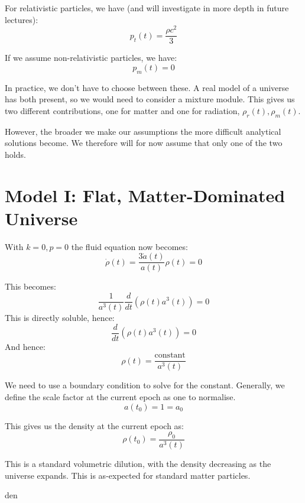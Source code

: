 For relativistic particles, we have (and will investigate in more depth in future lectures):
\[
    p_t(t) = \frac{\rho c^2}{3}
\]

If we assume non-relativistic particles, we have:
\[
    p_m(t) = 0
\]

In practice, we don't have to choose between these. A real model of a universe has both present, so we would need to consider a mixture module. This gives us two different contributions, one for matter and one for radiation, $\rho_r(t), \rho_m(t)$.

However, the broader we make our assumptions the more difficult analytical solutions become. We therefore will for now assume that only one of the two holds.

\section{Model I: Flat, Matter-Dominated Universe}
With $k = 0, p=0$ the fluid equation now becomes:
\[
    \dot{\rho}(t) = \frac{3 \dot{a}(t)}{a(t)} \rho(t) = 0
\]

This becomes:
\[
    \frac{1}{a^3(t)} \frac{d}{dt} \left(\rho(t) a^3(t)\right) = 0
\]
This is directly soluble, hence:
\[
    \frac{d}{dt} \left(\rho(t) a^3(t)\right) = 0
\]
And hence:
\[
    \rho(t) = \frac{\text{constant}}{a^3(t)}
\]

We need to use a boundary condition to solve for the constant. Generally, we define the scale factor at the current epoch as one to normalise.
\[
    a(t_0) = 1 = a_0
\]

This gives us the density at the current epoch as:
\[
    \rho(t_0) = \frac{\rho_0}{a^3(t)}
\]

This is a standard volumetric dilution, with the density decreasing as the universe expands. This is as-expected for standard matter particles.

den